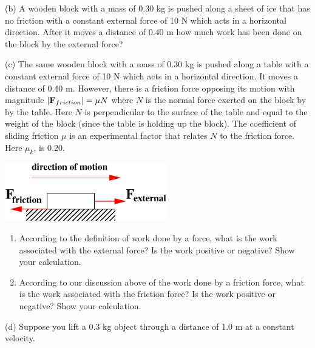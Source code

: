 (b) A wooden block with a mass of 0.30 kg is pushed along a sheet of ice that
has no friction with a constant external force of 10 N which acts in a horizontal
direction. After it moves a distance of 0.40 m how much work has been done on
the block by the external force?
\vspace{20mm}

(c) The same wooden block with a mass of 0.30 kg is pushed along a table with
a constant external force of 10 N which acts in a horizontal direction. It moves
a distance of 0.40 m. However, there is a friction force opposing its motion with magnitude 
$|{\bf F}_{friction}| = \mu N$ where $N$ is the normal force exerted on the block by by the table.
Here $N$ is perpendicular to the surface of the table and equal to the weight of the block (since the table
is holding up the block).
The coefficient of sliding friction $\mu$ is an experimental factor that relates $N$ to the friction force.
Here \( \mu _{k} \), is 0.20. 

\vspace{0.3cm}
{\par\centering \includegraphics[height=1in]{workAndKE/work_power_fig4b.eps} \par}
\vspace{0.3cm}

\begin{enumerate}
\item According to the definition of work done by a force, what is the work associated with the external force? 
Is the work positive or negative? Show your calculation.\vspace{20mm}

\item According to our discussion above of the work done by a friction force, 
what is the work associated with the friction force? 
Is the work positive or negative? Show your calculation.\vspace{20mm}

\end{enumerate}

\newpage

(d) Suppose you lift a 0.3 kg object through a distance of 1.0 m at a constant velocity.

